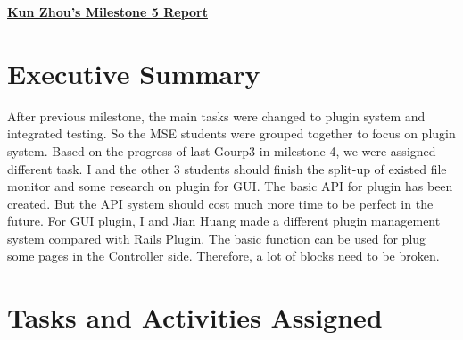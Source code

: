 \begin{center}
{\large\textbf{\underline{{Kun Zhou's Milestone 5 Report}}}}
\end{center}

\section*{Executive Summary}

After previous milestone, the main tasks were changed to plugin system and integrated testing. So the MSE students were grouped together to focus on plugin system. Based on the progress of last Gourp3 in milestone 4, we were assigned different task. I and the other 3 students should finish the split-up of existed file monitor and some research on plugin for GUI. The basic API for plugin has been created. But the API system should cost much more time to be perfect in the future. For GUI plugin, I and Jian Huang made a different plugin management system compared with Rails Plugin. The basic function can be used for plug some pages in the Controller side. Therefore, a lot of blocks need to be broken.

\section*{Tasks and Activities Assigned}

